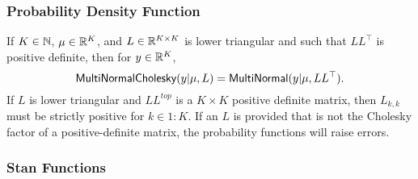 \subsubsection{Probability Density Function}

If $K \in \mathbb{N}$, $\mu \in \mathbb{R}^K$, and $L \in \mathbb{R}^{K \times K}$
is lower triangular and such that $LL^{\top}$ is positive definite,
then for $y \in \mathbb{R}^K$,
\[
\mbox{\sf MultiNormalCholesky}(y|\mu,L)
=
\mbox{\sf MultiNormal}(y|\mu,LL^{\top}).
\]
If $L$ is lower triangular and $LL^{top}$ is a $K \times K$ positive
definite matrix, then $L_{k,k}$ must be strictly positive for $k \in
1{:}K$.  If an $L$ is provided that is not the Cholesky factor of a
positive-definite matrix, the probability functions will raise errors.


\subsubsection{Stan Functions}

